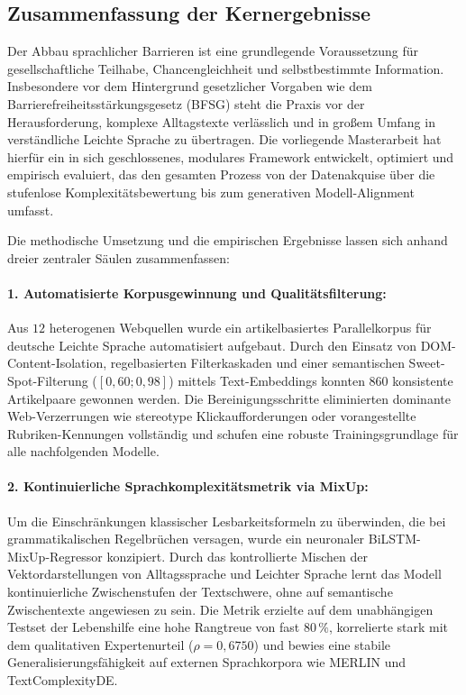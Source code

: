\subsection{Zusammenfassung der Kernergebnisse}
\label{sec:fazit_kernergebnisse}

Der Abbau sprachlicher Barrieren ist eine grundlegende Voraussetzung für gesellschaftliche Teilhabe, Chancengleichheit und selbstbestimmte Information. Insbesondere vor dem Hintergrund gesetzlicher Vorgaben wie dem Barrierefreiheitsstärkungsgesetz (BFSG) steht die Praxis vor der Herausforderung, komplexe Alltagstexte verlässlich und in großem Umfang in verständliche Leichte Sprache zu übertragen. Die vorliegende Masterarbeit hat hierfür ein in sich geschlossenes, modulares Framework entwickelt, optimiert und empirisch evaluiert, das den gesamten Prozess von der Datenakquise über die stufenlose Komplexitätsbewertung bis zum generativen Modell-Alignment umfasst.

Die methodische Umsetzung und die empirischen Ergebnisse lassen sich anhand dreier zentraler Säulen zusammenfassen:

\paragraph{1. Automatisierte Korpusgewinnung und Qualitätsfilterung:}
Aus $12$ heterogenen Webquellen wurde ein artikelbasiertes Parallelkorpus für deutsche Leichte Sprache automatisiert aufgebaut. Durch den Einsatz von DOM-Content-Isolation, regelbasierten Filterkaskaden und einer semantischen Sweet-Spot-Filterung ($[0{,}60; 0{,}98]$) mittels Text-Embeddings konnten $860$ konsistente Artikelpaare gewonnen werden. Die Bereinigungsschritte eliminierten dominante Web-Verzerrungen wie stereotype Klickaufforderungen oder vorangestellte Rubriken-Kennungen vollständig und schufen eine robuste Trainingsgrundlage für alle nachfolgenden Modelle.

\paragraph{2. Kontinuierliche Sprachkomplexitätsmetrik via MixUp:}
Um die Einschränkungen klassischer Lesbarkeitsformeln zu überwinden, die bei grammatikalischen Regelbrüchen versagen, wurde ein neuronaler BiLSTM-MixUp-Regressor konzipiert. Durch das kontrollierte Mischen der Vektordarstellungen von Alltagssprache und Leichter Sprache lernt das Modell kontinuierliche Zwischenstufen der Textschwere, ohne auf semantische Zwischentexte angewiesen zu sein. Die Metrik erzielte auf dem unabhängigen Testset der Lebenshilfe eine hohe Rangtreue von fast $80\,\%$, korrelierte stark mit dem qualitativen Expertenurteil ($\rho = 0{,}6750$) und bewies eine stabile Generalisierungsfähigkeit auf externen Sprachkorpora wie MERLIN und TextComplexityDE.

